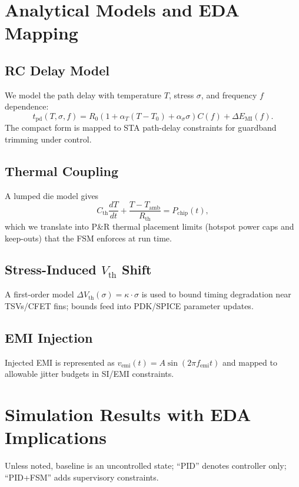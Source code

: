 \documentclass[conference]{IEEEtran}
\begin{document}

\section{Analytical Models and EDA Mapping}
\subsection{RC Delay Model}
We model the path delay with temperature $T$, stress $\sigma$, and frequency $f$ dependence:
\begin{equation}
t_{\mathrm{pd}}(T,\sigma,f)=R_0\!\left(1+\alpha_T(T-T_0)+\alpha_\sigma\sigma\right)C(f)+\Delta E_{\mathrm{MI}}(f).
\end{equation}
The compact form is mapped to STA path-delay constraints for guardband trimming under control.

\subsection{Thermal Coupling}
A lumped die model gives
\begin{equation}
C_{\mathrm{th}}\frac{dT}{dt}+\frac{T-T_{\mathrm{amb}}}{R_{\mathrm{th}}}=P_{\mathrm{chip}}(t),
\end{equation}
which we translate into P\&R thermal placement limits (hotspot power caps and keep-outs) that the FSM enforces at run time.

\subsection{Stress-Induced $V_{\mathrm{th}}$ Shift}
A first-order model $\Delta V_{\mathrm{th}}(\sigma)=\kappa\cdot\sigma$ is used to bound timing degradation near TSVs/CFET fins; bounds feed into PDK/SPICE parameter updates.

\subsection{EMI Injection}
Injected EMI is represented as $v_{\mathrm{emi}}(t)=A\sin (2\pi f_{\mathrm{emi}} t)$ and mapped to allowable jitter budgets in SI/EMI constraints.

\section{Simulation Results with EDA Implications}
Unless noted, baseline is an uncontrolled state; ``PID'' denotes controller only; ``PID+FSM'' adds supervisory constraints.
\end{document}
